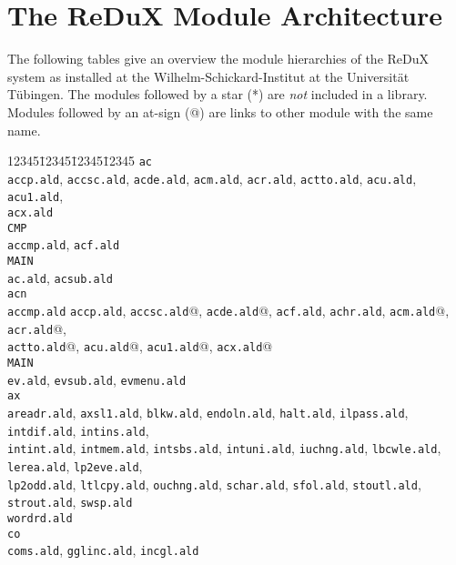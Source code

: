 \section{The ReDuX Module Architecture}

The following tables give an overview the module hierarchies of the
ReDuX system as installed at the Wilhelm-Schickard-Institut at the
Universit\"{a}t T\"{u}bingen.
The modules followed by a star (*) are {\em not} included in a library.
Modules followed by an at-sign (@) are links to other module with the same 
name.

{\small
\begin{tabbing}
12345\=12345\=12345\=12345  \kill
 {\tt ac} \+  \\
  {\tt accp.ald}, {\tt accsc.ald}, {\tt acde.ald}, {\tt acm.ald}, 
  {\tt acr.ald},  {\tt actto.ald},  {\tt acu.ald}, {\tt acu1.ald}, \\
  {\tt acx.ald}\\
  {\tt CMP} \+ \\
       {\tt accmp.ald}, {\tt acf.ald} \- \\
  {\tt MAIN} \+ \\
        {\tt ac.ald}, {\tt acsub.ald} \- \- \\
 {\tt acn} \+  \\
  {\tt accmp.ald} {\tt accp.ald}, {\tt accsc.ald}@, {\tt acde.ald}@, 
  {\tt acf.ald}, {\tt achr.ald}, {\tt acm.ald}@,  {\tt acr.ald}@, \\
  {\tt actto.ald}@,  {\tt acu.ald}@, {\tt acu1.ald}@,  {\tt acx.ald}@\\
  {\tt MAIN} \+ \\
        {\tt ev.ald}, {\tt evsub.ald}, {\tt evmenu.ald} \- \- \\
 {\tt ax} \+ \\
    {\tt areadr.ald}, {\tt axsl1.ald}, {\tt blkw.ald}, {\tt endoln.ald}, 
    {\tt halt.ald},   {\tt ilpass.ald}, {\tt intdif.ald},  {\tt intins.ald}, \\
    {\tt intint.ald}, {\tt intmem.ald}, {\tt intsbs.ald}, {\tt intuni.ald}, 
    {\tt iuchng.ald}, {\tt lbcwle.ald}, {\tt lerea.ald}, {\tt lp2eve.ald}, \\
    {\tt lp2odd.ald}, {\tt ltlcpy.ald}, {\tt ouchng.ald}, {\tt schar.ald},
    {\tt sfol.ald}, {\tt stoutl.ald}, {\tt strout.ald}, {\tt swsp.ald} \\
    {\tt wordrd.ald}   \- \\
 {\tt co} \+ \\
    {\tt coms.ald}, {\tt gglinc.ald}, {\tt incgl.ald}  \- \\

\end{tabbing}}
